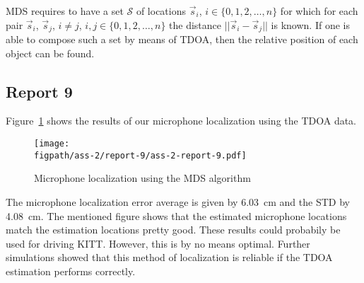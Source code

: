 \documentclass[11pt,titlepage]{report}
\newcommand{\figpath}{../../deliverable-7-resources/figures}
\begin{document}
MDS requires to have a set $\mathcal{S}$ of locations $\vec{s}_i$, $i \in \{0,1,2,\dots,n\}$ for which for each pair $\vec{s}_i$, $\vec{s}_j$, $i \neq j$, $i, j \in \{0,1,2,\dots,n\}$ the distance $||\vec{s}_i-\vec{s}_j||$ is known. If one is able to compose such a set by means of TDOA, then the relative position of each object can be found.

\subsection{Report 9}
\label{subsec:ass-2-rep-9}
Figure~\ref{fig:ass-2-rep-9} shows the results of our microphone localization using the TDOA data.

\begin{figure}[H]
	\begin{center}
		\texttt{[image: \\figpath/ass-2/report-9/ass-2-report-9.pdf]}
	\end{center}
	\caption{Microphone localization using the MDS algorithm}
	\label{fig:ass-2-rep-9}
\end{figure}

The microphone localization error average is given by \SI{6.03}{cm} and the STD by \SI{4.08}{cm}. The mentioned figure shows that the estimated microphone locations match the estimation locations pretty good. These results could probabily be used for driving KITT. However, this is by no means optimal. Further simulations showed that this method of localization is reliable if the TDOA estimation performs correctly.


	
\end{document}
